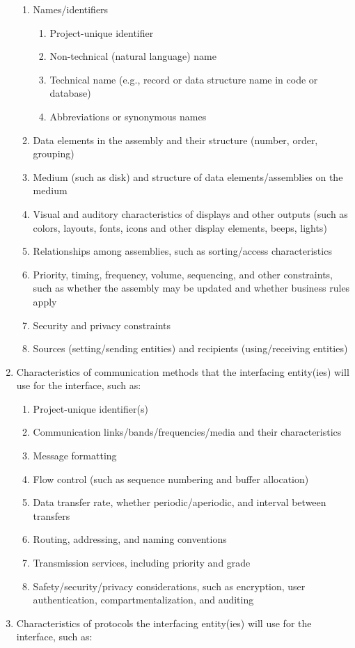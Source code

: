 \documentclass{fidata-report-template}
\begin{document}
\begin{enumerate}
  \begin{enumerate}
  \itemsep1pt\parskip0pt
  \item
    Names/identifiers

    \begin{enumerate}
    \itemsep1pt\parskip0pt
    \item
      Project-unique identifier
    \item
      Non-technical (natural language) name
    \item
      Technical name (e.g., record or data structure name in code or
      database)
    \item
      Abbreviations or synonymous names
    \end{enumerate}
  \item
    Data elements in the assembly and their structure (number, order,
    grouping)
  \item
    Medium (such as disk) and structure of data elements/assemblies on
    the medium
  \item
    Visual and auditory characteristics of displays and other outputs
    (such as colors, layouts, fonts, icons and other display elements,
    beeps, lights)
  \item
    Relationships among assemblies, such as sorting/access
    characteristics
  \item
    Priority, timing, frequency, volume, sequencing, and other
    constraints, such as whether the assembly may be updated and whether
    business rules apply
  \item
    Security and privacy constraints
  \item
    Sources (setting/sending entities) and recipients (using/receiving
    entities)
  \end{enumerate}
\item
  Characteristics of communication methods that the interfacing
  entity(ies) will use for the interface, such as:

  \begin{enumerate}
  \itemsep1pt\parskip0pt
  \item
    Project-unique identifier(s)
  \item
    Communication links/bands/frequencies/media and their
    characteristics
  \item
    Message formatting
  \item
    Flow control (such as sequence numbering and buffer allocation)
  \item
    Data transfer rate, whether periodic/aperiodic, and interval between
    transfers
  \item
    Routing, addressing, and naming conventions
  \item
    Transmission services, including priority and grade
  \item
    Safety/security/privacy considerations, such as encryption, user
    authentication, compartmentalization, and auditing
  \end{enumerate}
\item
  Characteristics of protocols the interfacing entity(ies) will use for
  the interface, such as:


\end{enumerate}
\end{document}
